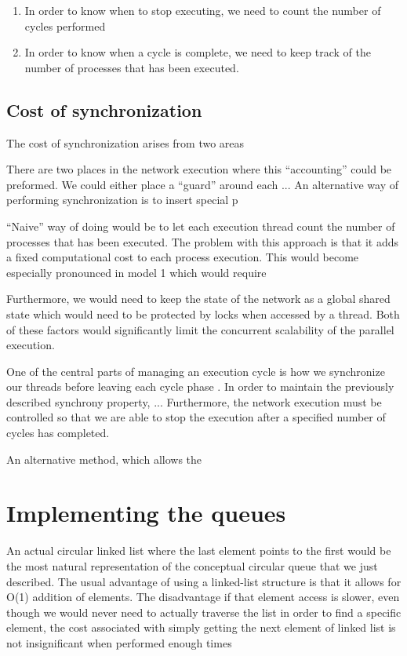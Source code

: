 \begin{enumerate}
\item In order to know when to stop executing, we need to count the
  number of cycles performed
\item In order to know when a cycle is complete, we need to keep track
  of the number of processes that has been executed.
\end{enumerate}

\subsection{Cost of synchronization}
The cost of synchronization arises from two areas


There are two places in the network execution where this
``accounting'' could be preformed. We could either place a ``guard''
around each ... An alternative way of performing synchronization is to
insert special p

``Naive'' way of doing would be to let each execution thread count the
number of processes that has been executed. The problem with this
approach is that it adds a fixed computational cost to each process
execution. This would become especially pronounced in model 1
which would require 

Furthermore, we would need to keep the state of the network
as a global shared state which would need to be protected by locks
when accessed by a thread. Both of these factors would significantly
limit the concurrent scalability of the parallel execution. 

One of the central parts of managing an execution cycle is how we
synchronize our threads before leaving each cycle phase
. In order to maintain the previously described
synchrony property, ... Furthermore, the network execution must be
controlled so that we are able to stop the execution after a specified
number of cycles has completed.


An alternative method, which allows the 

\section{Implementing the queues}
An actual circular linked list where the last element points to the
first would be the most natural representation of the conceptual
circular queue that we just described. The usual advantage of using a
linked-list structure is that it allows for O(1) addition of
elements. The disadvantage if that element access is slower, even
though we would never need to actually traverse the list in order to
find a specific element, the cost associated with simply getting the
next element of linked list is not insignificant when performed enough
times 

